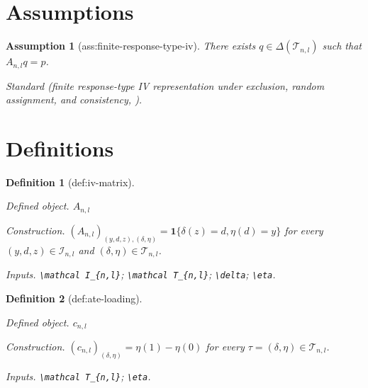 \documentclass{article}
\newtheorem{assumption}{Assumption}
\newtheorem{definition}{Definition}
\begin{document}
\section{Assumptions}

\begin{assumption}[ass:finite-response-type-iv]\label{ass:finite-response-type-iv}
There exists \(q\in\Delta(\mathcal T_{n,l})\) such that \(A_{n,l}q=p\).
\par\smallskip\noindent\emph{Standard} (finite response-type IV representation under exclusion, random assignment, and consistency, \cite{BoushehrianBadriAkbariKiyavash2026}).
\end{assumption}

\section{Definitions}

\begin{definition}[def:iv-matrix]\label{def:iv-matrix}
\par\smallskip\noindent\emph{Defined object.} \(A_{n,l}\)
\par\smallskip\noindent\emph{Construction.} \((A_{n,l})_{(y,d,z),(\delta,\eta)}=\mathbf 1\{\delta(z)=d,\eta(d)=y\}\) for every \((y,d,z)\in\mathcal I_{n,l}\) and \((\delta,\eta)\in\mathcal T_{n,l}\).
\par\smallskip\noindent\emph{Inputs.} \texttt{\textbackslash{}\allowbreak{}mathcal I\_\allowbreak{}\{n,\allowbreak{}l\}\allowbreak{}}; \texttt{\textbackslash{}\allowbreak{}mathcal T\_\allowbreak{}\{n,\allowbreak{}l\}\allowbreak{}}; \texttt{\textbackslash{}\allowbreak{}delta}; \texttt{\textbackslash{}\allowbreak{}eta}.
\end{definition}

\begin{definition}[def:ate-loading]\label{def:ate-loading}
\par\smallskip\noindent\emph{Defined object.} \(c_{n,l}\)
\par\smallskip\noindent\emph{Construction.} \((c_{n,l})_{(\delta,\eta)}=\eta(1)-\eta(0)\) for every \(\tau=(\delta,\eta)\in\mathcal T_{n,l}\).
\par\smallskip\noindent\emph{Inputs.} \texttt{\textbackslash{}\allowbreak{}mathcal T\_\allowbreak{}\{n,\allowbreak{}l\}\allowbreak{}}; \texttt{\textbackslash{}\allowbreak{}eta}.
\end{definition}
\end{document}
